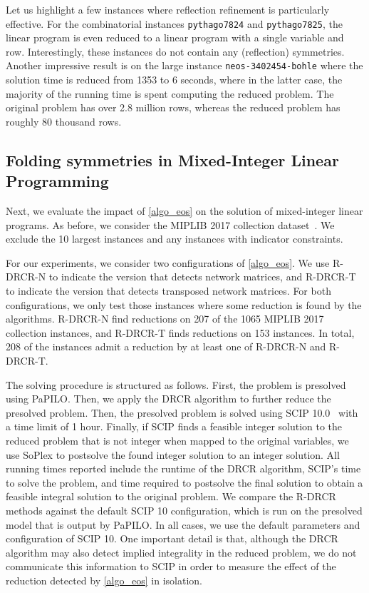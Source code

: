 \documentclass[pdflatex,sn-mathphys-num]{sn-jnl}%
\theoremstyle{thmstyleone}%
\theoremstyle{thmstylethree}%
\theoremstyle{thmstyletwo}%
\begin{document}
Let us highlight a few instances where reflection refinement is particularly effective.
For the combinatorial instances \texttt{pythago7824} and \texttt{pythago7825}, the linear program is even reduced to a linear program with a single variable and row. Interestingly, these instances do not contain any (reflection) symmetries.
Another impressive result is on the large instance \texttt{neos-3402454-bohle} where the solution time is reduced from 1353 to 6 seconds, where in the latter case, the majority of the running time is spent computing the reduced problem. The original problem has over 2.8 million rows, whereas the reduced problem has roughly 80 thousand rows.
\subsection{Folding symmetries in Mixed-Integer Linear Programming}
\label{sec_milp_folding_results}
Next, we evaluate the impact of \cref{algo_eos} on the solution of mixed-integer linear programs. As before, we consider the MIPLIB 2017 collection dataset~\cite{Gleixner2021}. We exclude the 10 largest instances and any instances with indicator constraints.

For our experiments, we consider two configurations of \cref{algo_eos}. We use R-DRCR-N to indicate the version that detects network matrices, and R-DRCR-T to indicate the version that detects transposed network matrices. For both configurations, we only test those instances where some reduction is found by the algorithms. R-DRCR-N find reductions on 207 of the 1065 MIPLIB 2017 collection instances, and R-DRCR-T finds reductions on 153 instances. In total, 208 of the instances admit a reduction by at least one of R-DRCR-N and R-DRCR-T.

The solving procedure is structured as follows. First, the problem is presolved using PaPILO. Then, we apply the DRCR algorithm to further reduce the presolved problem. Then, the presolved problem is solved using SCIP 10.0~\cite{hojny2025scipoptimizationsuite100} with a time limit of 1 hour. Finally, if SCIP finds a feasible integer solution to the reduced problem that is not integer when mapped to the original variables, we use SoPlex to postsolve the found integer solution to an integer solution. All running times reported include the runtime of the DRCR algorithm, SCIP's time to solve the problem, and time required to postsolve the final solution to obtain a feasible integral solution to the original problem. We compare the R-DRCR methods against the default SCIP 10 configuration, which is run on the presolved model that is output by PaPILO.
In all cases, we use the default parameters and configuration of SCIP 10.
One important detail is that, although the DRCR algorithm may also detect implied integrality in the reduced problem, we do not communicate this information to SCIP in order to measure the effect of the reduction detected by \cref{algo_eos} in isolation. 
\end{document}
